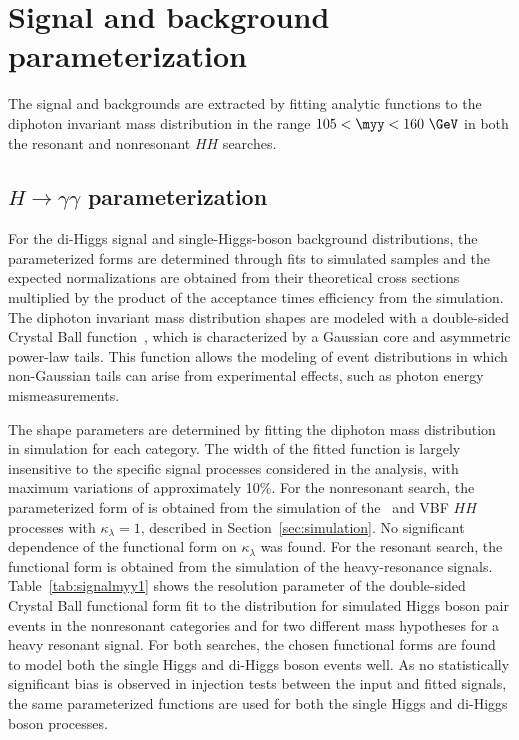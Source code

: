 \documentclass[PAPER, cernpreprint, texlive=2016, paper=a4, USenglish, texmf]{atlasdoc}
\begin{document}
 
 
 
\section{Signal and background parameterization}
\label{sec:sigbackpar}
 
The signal and backgrounds are extracted by fitting analytic functions to the diphoton invariant mass distribution in the range $105 < \myy < 160~\GeV$ in both the resonant and nonresonant $HH$ searches.
 
\subsection{$H \rightarrow \gamma \gamma$ parameterization}
For the di-Higgs signal and single-Higgs-boson background distributions, the parameterized forms are determined through fits to simulated samples and the expected normalizations are obtained from their theoretical cross sections multiplied by the product of the acceptance times efficiency from the simulation. The diphoton invariant mass distribution shapes are modeled with a double-sided Crystal Ball function~\cite{HIGG-2013-08,dscb1}, which is characterized by a Gaussian core and asymmetric power-law tails. This function allows the modeling of event distributions in which non-Gaussian tails can arise from experimental effects, such as photon energy mismeasurements. 
 
The shape parameters are determined by fitting the diphoton mass distribution in simulation for each category. The width of the fitted function is largely insensitive to the specific signal processes considered in the analysis, with maximum variations of approximately 10\%.
For the nonresonant search, the  parameterized form of \myy{} is obtained from the simulation of the \ggF\ and VBF $HH$ processes with $\kappa_{\lambda}=1$, described in Section~\ref{sec:simulation}. No significant dependence of the functional form on $\kappa_{\lambda}$ was found. 
For the resonant search, the functional form is obtained from the simulation of the heavy-resonance signals.
Table~\ref{tab:signalmyy1} shows the resolution parameter  of the  double-sided Crystal Ball functional form fit to the \myy{} distribution for simulated Higgs boson pair events in the nonresonant categories and for two different mass hypotheses for a heavy resonant signal. 
For both searches, the chosen functional forms are found to model both the single Higgs and di-Higgs boson events well.
As no statistically significant bias is observed in injection tests between the input and fitted signals, the same parameterized functions are used for both the single Higgs and  di-Higgs boson processes.
 
\end{document}
